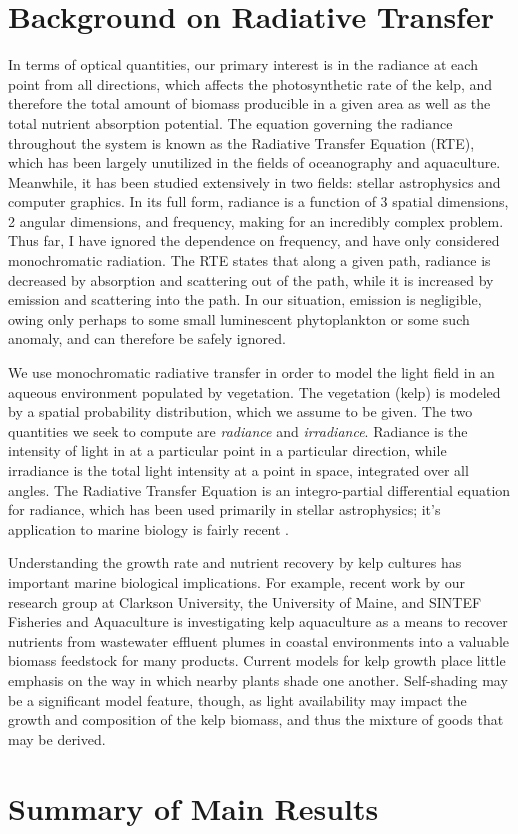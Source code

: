 \section{Background on Radiative Transfer}
In terms of optical quantities, our primary interest is in the radiance at each point from all directions, which affects the photosynthetic rate of the kelp, and therefore the total amount of biomass producible in a given area as well as the total nutrient absorption potential.
The equation governing the radiance throughout the system is known as the Radiative Transfer Equation (RTE), which has been largely unutilized in the fields of oceanography and aquaculture.
Meanwhile, it has been studied extensively in two fields: stellar astrophysics and computer graphics.
In its full form, radiance is a function of 3 spatial dimensions, 2 angular dimensions, and frequency, making for an incredibly complex problem.
Thus far, I have ignored the dependence on frequency, and have only considered monochromatic radiation.
The RTE states that along a given path, radiance is decreased by absorption and scattering out of the path, while it is increased by emission and scattering into the path.
In our situation, emission is negligible, owing only perhaps to some small luminescent phytoplankton or some such anomaly, and can therefore be safely ignored.

We use monochromatic radiative transfer in order to model the light field in an aqueous environment populated by vegetation.
The vegetation (kelp) is modeled by a spatial probability distribution, which we assume to be given.
The two quantities we seek to compute are \textit{radiance} and \textit{irradiance}.
Radiance is the intensity of light in at a particular point in a particular direction, while irradiance is the total light intensity at a point in space, integrated over all angles.
The Radiative Transfer Equation is an integro-partial differential equation for radiance, which has been used primarily in stellar astrophysics; it's application to marine biology is fairly recent \cite{mobley_radiative_2001}.

Understanding the growth rate and nutrient recovery by
kelp cultures has important marine biological implications. For example, recent
work by our research group at Clarkson University, the University of Maine, and
SINTEF Fisheries and Aquaculture is investigating kelp aquaculture as a means to
recover nutrients from wastewater effluent plumes in coastal environments into a
valuable biomass feedstock for many products. Current models for kelp growth
place little emphasis on the way in which nearby plants shade one another.
Self-shading may be a significant model feature, though, as light availability
may impact the growth and composition of the kelp biomass, and thus the mixture
of goods that may be derived.


\section{Summary of Main Results}